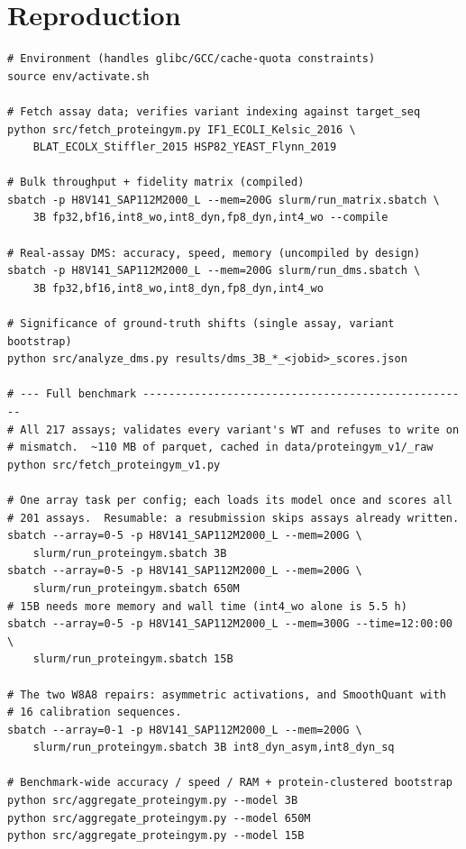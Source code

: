 \documentclass[11pt]{article}
\begin{document}
\section{Reproduction}

\begin{footnotesize}
\begin{verbatim}
# Environment (handles glibc/GCC/cache-quota constraints)
source env/activate.sh

# Fetch assay data; verifies variant indexing against target_seq
python src/fetch_proteingym.py IF1_ECOLI_Kelsic_2016 \
    BLAT_ECOLX_Stiffler_2015 HSP82_YEAST_Flynn_2019

# Bulk throughput + fidelity matrix (compiled)
sbatch -p H8V141_SAP112M2000_L --mem=200G slurm/run_matrix.sbatch \
    3B fp32,bf16,int8_wo,int8_dyn,fp8_dyn,int4_wo --compile

# Real-assay DMS: accuracy, speed, memory (uncompiled by design)
sbatch -p H8V141_SAP112M2000_L --mem=200G slurm/run_dms.sbatch \
    3B fp32,bf16,int8_wo,int8_dyn,fp8_dyn,int4_wo

# Significance of ground-truth shifts (single assay, variant bootstrap)
python src/analyze_dms.py results/dms_3B_*_<jobid>_scores.json

# --- Full benchmark ---------------------------------------------------
# All 217 assays; validates every variant's WT and refuses to write on
# mismatch.  ~110 MB of parquet, cached in data/proteingym_v1/_raw
python src/fetch_proteingym_v1.py

# One array task per config; each loads its model once and scores all
# 201 assays.  Resumable: a resubmission skips assays already written.
sbatch --array=0-5 -p H8V141_SAP112M2000_L --mem=200G \
    slurm/run_proteingym.sbatch 3B
sbatch --array=0-5 -p H8V141_SAP112M2000_L --mem=200G \
    slurm/run_proteingym.sbatch 650M
# 15B needs more memory and wall time (int4_wo alone is 5.5 h)
sbatch --array=0-5 -p H8V141_SAP112M2000_L --mem=300G --time=12:00:00 \
    slurm/run_proteingym.sbatch 15B

# The two W8A8 repairs: asymmetric activations, and SmoothQuant with
# 16 calibration sequences.
sbatch --array=0-1 -p H8V141_SAP112M2000_L --mem=200G \
    slurm/run_proteingym.sbatch 3B int8_dyn_asym,int8_dyn_sq

# Benchmark-wide accuracy / speed / RAM + protein-clustered bootstrap
python src/aggregate_proteingym.py --model 3B
python src/aggregate_proteingym.py --model 650M
python src/aggregate_proteingym.py --model 15B


\end{verbatim}
\end{footnotesize}
\end{document}
